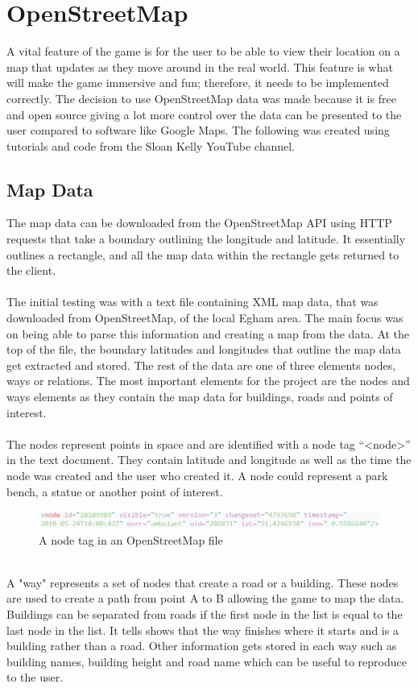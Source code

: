 \documentclass[a4paper]{report}
\begin{document}
\section{OpenStreetMap}
A vital feature of the game is for the user to be able to view their location on a map that updates as they move around in the real world. This feature is what will make the game immersive and fun; therefore, it needs to be implemented correctly. The decision to use OpenStreetMap data was made because it is free and open source giving a lot more control over the data can be presented to the user compared to software like Google Maps. The following was created using tutorials and code from the Sloan Kelly YouTube channel. \cite{Sloan}

\subsection{Map Data}
The map data can be downloaded from the OpenStreetMap API using HTTP requests that take a boundary outlining the longitude and latitude. It essentially outlines a rectangle, and all the map data within the rectangle gets returned to the client. \cite{API}
\\\\
The initial testing was with a text file containing XML map data, that was downloaded from OpenStreetMap, of the local Egham area. The main focus was on being able to parse this information and creating a map from the data. At the top of the file, the boundary latitudes and longitudes that outline the map data get extracted and stored. The rest of the data are one of three elements nodes, ways or relations. The most important elements for the project are the nodes and ways elements as they contain the map data for buildings, roads and points of interest.
\\\\
The nodes represent points in space and are identified with a node tag “<node>” in the text document. They contain latitude and longitude as well as the time the node was created and the user who created it. A node could represent a park bench, a statue or another point of interest. \cite{API}
\begin{figure}[h]
\centering
\includegraphics[scale=0.64]{node}
\caption{A node tag in an OpenStreetMap file}
\end{figure}
\\A "way" represents a set of nodes that create a road or a building. These nodes are used to create a path from point A to B allowing the game to map the data. Buildings can be separated from roads if the first node in the list is equal to the last node in the list. It tells shows that the way finishes where it starts and is a building rather than a road. Other information gets stored in each way such as building names, building height and road name which can be useful to reproduce to the user.
\end{document}
